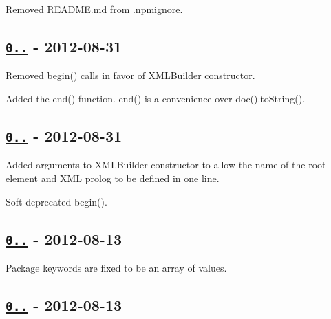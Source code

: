 \begin{DoxyItemize}
\item Removed R\+E\+A\+D\+M\+E.\+md from {\ttfamily .npmignore}.
\end{DoxyItemize}

\subsection*{\href{https://github.com/oozcitak/xmlbuilder-js/compare/v0.4.0...v0.4.1}{\tt 0..} -\/ 2012-\/08-\/31}


\begin{DoxyItemize}
\item Removed {\ttfamily begin()} calls in favor of {\ttfamily X\+M\+L\+Builder} constructor.
\item Added the {\ttfamily end()} function. {\ttfamily end()} is a convenience over {\ttfamily doc().to\+String()}.
\end{DoxyItemize}

\subsection*{\href{https://github.com/oozcitak/xmlbuilder-js/compare/v0.3.11...v0.4.0}{\tt 0..} -\/ 2012-\/08-\/31}


\begin{DoxyItemize}
\item Added arguments to {\ttfamily X\+M\+L\+Builder} constructor to allow the name of the root element and X\+ML prolog to be defined in one line.
\item Soft deprecated {\ttfamily begin()}.
\end{DoxyItemize}

\subsection*{\href{https://github.com/oozcitak/xmlbuilder-js/compare/v0.3.10...v0.3.11}{\tt 0..} -\/ 2012-\/08-\/13}


\begin{DoxyItemize}
\item Package keywords are fixed to be an array of values.
\end{DoxyItemize}

\subsection*{\href{https://github.com/oozcitak/xmlbuilder-js/compare/v0.3.3...v0.3.10}{\tt 0..} -\/ 2012-\/08-\/13}



